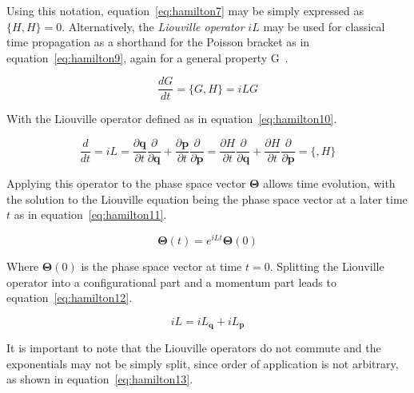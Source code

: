 \documentclass[11pt]{article}
\begin{document}
\bigskip

\noindent Using this notation, equation~\ref{eq:hamilton7} may be simply expressed as $\{H, H\} = 0$. Alternatively, the \textit{Liouville operator} $iL$ may be used for classical time propagation as a shorthand for the Poisson bracket as in equation~\ref{eq:hamilton9}, again for a general property G~\cite{Frenkel1997}.

\begin{equation}
  \frac{dG}{dt} = \{G, H\} = iLG
  \label{eq:hamilton9}
\end{equation}

\bigskip

\noindent With the Liouville operator defined as in equation~\ref{eq:hamilton10}.

\begin{equation}
  \frac{d}{dt} = iL = \frac{\partial \textbf{q}}{\partial t} \frac{\partial}{\partial \textbf{q}} + \frac{\partial \textbf{p}}{\partial t} \frac{\partial}{\partial \textbf{p} } = \frac{\partial H}{\partial t} \frac{\partial}{\partial \textbf{q}} + \frac{\partial H}{\partial t} \frac{\partial}{\partial \textbf{p} } = \{, H\}
  \label{eq:hamilton10}
\end{equation}

\bigskip

\noindent Applying this operator to the phase space vector $\mathbf{\Theta}$ allows time evolution, with the solution to the Liouville equation being the phase space vector at a later time $t$ as in equation~\ref{eq:hamilton11}.

\begin{equation}
  \mathbf{\Theta}(t) = e^{iLt}\mathbf{\Theta}(0)
  \label{eq:hamilton11}
\end{equation}

\bigskip

\noindent Where $\mathbf{\Theta}(0)$ is the phase space vector at time $t=0$. Splitting the Liouville operator into a configurational part and a momentum part leads to  equation~\ref{eq:hamilton12}.


\begin{equation}
  iL = iL_{\textbf{q}} + iL_{\textbf{p}}
  \label{eq:hamilton12}
\end{equation}

\bigskip

\noindent It is important to note that the Liouville operators do not commute and the exponentials may not be simply split, since order of application is not arbitrary, as shown in equation~\ref{eq:hamilton13}.
\end{document}

